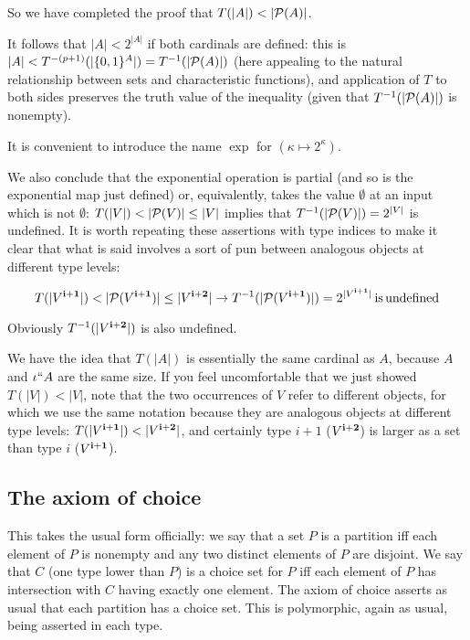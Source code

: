 \documentclass[12pt]{article}
\begin{document}
So we have completed the proof that $T(|A|) < |{\cal P}(A)|$.

It follows that $|A| < 2^{|A|}$ if both cardinals are defined:  this is $|A| < T^{-(p+1)}(|\{0,1\}^A|) = T^{-1}(|{\cal P}(A)|)$ (here appealing to the natural relationship between sets and characteristic functions), and application of $T$ to both sides preserves the truth value of the inequality (given that $T^{-1}(|{\cal P}(A)|)$ is nonempty).

It is convenient to introduce the name $\exp$ for $(\kappa \mapsto 2^{\kappa})$.

We also conclude that the exponential operation is partial (and so is the exponential map just defined)  or, equivalently, takes the value $\emptyset$ at an input which is not $\emptyset$:  $T(|V|) < |{\cal P}(V)| \leq |V|$ implies that $T^{-1}(|{\cal P}(V)|) = 2^{|V|}$ is undefined.  It is worth repeating these assertions with type indices to make it clear that what is said involves a sort of pun between analogous objects at different type levels:

$$T(|V^{\bf i+1}|) < |{\cal P}(V^{\bf i+1})| \leq |V^{\bf i+2}| \rightarrow T^{-1}(|{\cal P}(V^{\bf i+1})|) = 2^{|V^{\bf i+1}|} \mathrm{\, is \, undefined}$$ 

Obviously $T^{-1}(|V^{\bf i+2}|)$ is also undefined. 

We have the idea that $T(|A|)$ is essentially the same cardinal as $A$, because $A$ and $\iota``A$ are the same size.  If you feel uncomfortable that we just
showed $T(|V|) < |V|$, note that the two occurrences of $V$ refer to different objects, for which we use the same notation because they are analogous objects at different type levels:
$T(|V^{\bf i+1}|) < |V^{\bf i+2}|$, and certainly type $i+1$ ($V^{\bf i+2}$) is larger as a set than type $i$ ($V^{\bf i+1}$).

\subsection{The axiom of choice}

This takes the usual form officially:  we say that a set $P$ is a partition iff each element of $P$ is nonempty and any two distinct elements of $P$ are disjoint.  We say that $C$ (one type lower than $P$) is a choice set for $P$
iff each element of $P$ has intersection with $C$ having exactly one element.  The axiom of choice asserts as usual that each partition has a choice set.  This is polymorphic, again as usual, being asserted in each type.
\end{document}
